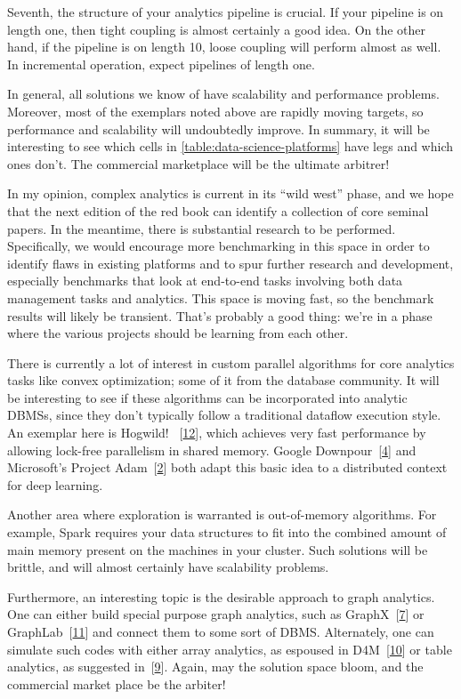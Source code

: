 \documentclass[b5paper,11pt,twoside,openright]{book}
\begin{document}
Seventh, the structure of your analytics pipeline is crucial. If your
pipeline is on length one, then tight coupling is almost certainly a
good idea. On the other hand, if the pipeline is on length 10, loose
coupling will perform almost as well. In incremental operation, expect
pipelines of length one.

In general, all solutions we know of have scalability and performance
problems. Moreover, most of the exemplars noted above are rapidly moving
targets, so performance and scalability will undoubtedly improve. In
summary, it will be interesting to see which cells in \autoref{table:data-science-platforms} have legs
and which ones don't. The commercial marketplace will be the ultimate
arbitrer!

In my opinion, complex analytics is current in its ``wild west'' phase,
and we hope that the next edition of the red book can identify a
collection of core seminal papers. In the meantime, there is substantial
research to be performed. Specifically, we would encourage more
benchmarking in this space in order to identify flaws in existing
platforms and to spur further research and development, especially
benchmarks that look at end-to-end tasks involving both data management
tasks and analytics. This space is moving fast, so the benchmark results
will likely be transient. That's probably a good thing: we're in a phase
where the various projects should be learning from each other.

There is currently a lot of interest in custom parallel algorithms for
core analytics tasks like convex optimization; some of it from the
database community. It will be interesting to see if these algorithms
can be incorporated into analytic DBMSs, since they don't typically
follow a traditional dataflow execution style. An exemplar here is
Hogwild! ~{{[}\protect\hyperlink{ref-hogwild}{12}{]}}, which achieves
very fast performance by allowing lock-free parallelism in shared
memory. Google Downpour~{{[}\protect\hyperlink{ref-dean2012large}{4}{]}}
and Microsoft's Project
Adam~{{[}\protect\hyperlink{ref-projectadam}{2}{]}} both adapt this
basic idea to a distributed context for deep learning.

Another area where exploration is warranted is out-of-memory algorithms.
For example, Spark requires your data structures to fit into the
combined amount of main memory present on the machines in your cluster.
Such solutions will be brittle, and will almost certainly have
scalability problems.

Furthermore, an interesting topic is the desirable approach to graph
analytics. One can either build special purpose graph analytics, such as
GraphX~{{[}\protect\hyperlink{ref-graphx}{7}{]}} or
GraphLab~{{[}\protect\hyperlink{ref-graphlab}{11}{]}} and connect them
to some sort of DBMS. Alternately, one can simulate such codes with
either array analytics, as espoused in
D4M~{{[}\protect\hyperlink{ref-d4m}{10}{]}} or table analytics, as
suggested in~{{[}\protect\hyperlink{ref-vertexica}{9}{]}}. Again, may
the solution space bloom, and the commercial market place be the
arbiter!
\end{document}

